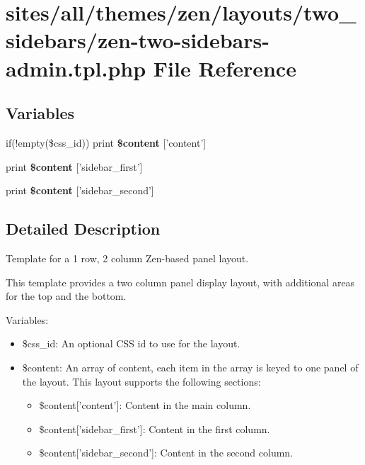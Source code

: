 \hypertarget{zen-two-sidebars-admin_8tpl_8php}{
\section{sites/all/themes/zen/layouts/two\_\-sidebars/zen-two-sidebars-admin.tpl.php File Reference}
\label{zen-two-sidebars-admin_8tpl_8php}
}
\subsection*{Variables}
\begin{CompactItemize}
\item 
\hypertarget{zen-two-sidebars-admin_8tpl_8php_16767ac2e2b027ec00a0c12535d2ba7a}{
if(!empty(\$css\_\-id)) print \textbf{\$content} \mbox{[}'content'\mbox{]}}
\label{zen-two-sidebars-admin_8tpl_8php_16767ac2e2b027ec00a0c12535d2ba7a}

\item 
\hypertarget{zen-two-sidebars-admin_8tpl_8php_8fbe76276dfb5a084cc042c32e8e6394}{
print \textbf{\$content} \mbox{[}'sidebar\_\-first'\mbox{]}}
\label{zen-two-sidebars-admin_8tpl_8php_8fbe76276dfb5a084cc042c32e8e6394}

\item 
\hypertarget{zen-two-sidebars-admin_8tpl_8php_4f8fb8ae436a00e7bdfe8b16bc3f0dd4}{
print \textbf{\$content} \mbox{[}'sidebar\_\-second'\mbox{]}}
\label{zen-two-sidebars-admin_8tpl_8php_4f8fb8ae436a00e7bdfe8b16bc3f0dd4}

\end{CompactItemize}


\subsection{Detailed Description}
Template for a 1 row, 2 column Zen-based panel layout.

This template provides a two column panel display layout, with additional areas for the top and the bottom.

Variables:\begin{itemize}
\item \$css\_\-id: An optional CSS id to use for the layout.\item \$content: An array of content, each item in the array is keyed to one panel of the layout. This layout supports the following sections:\begin{itemize}
\item \$content\mbox{[}'content'\mbox{]}: Content in the main column.\item \$content\mbox{[}'sidebar\_\-first'\mbox{]}: Content in the first column.\item \$content\mbox{[}'sidebar\_\-second'\mbox{]}: Content in the second column. \end{itemize}
\end{itemize}

